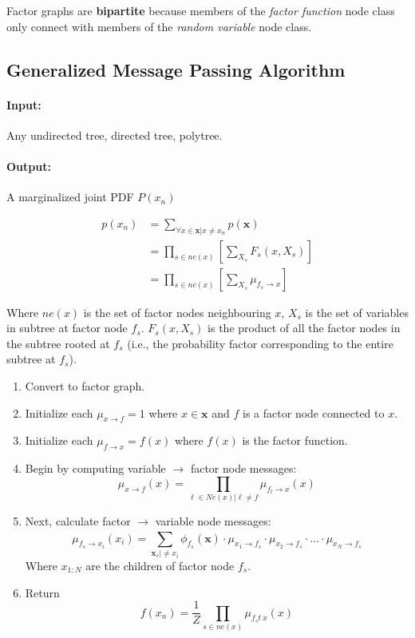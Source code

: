 \documentclass[a4paper,12pt]{report}
\begin{document}
Factor graphs are \textbf{bipartite} because members of the \textit{factor function} node class only connect with members of the \textit{random variable} node class.

\subsection{Generalized Message Passing Algorithm}

\paragraph{Input: } Any undirected tree, directed tree, polytree.

\paragraph{Output: } A marginalized joint PDF $P(x_n)$

\begin{equation}
\begin{split}
p(x_n) &= \sum_{\forall x\in \pmb x | x\neq x_n}^{} p(\pmb x) \\
&= \prod_{s\in ne(x)} [\sum_{X_s}^{} F_s(x, X_s)] \\
&= \prod_{s\in ne(x)} [\sum_{X_s} \mu_{f_s\to x}]
\end{split}
\end{equation}

Where $ne(x)$ is the set of factor nodes neighbouring $x$, $X_s$ is the set of variables in subtree at factor node $f_s$. $F_s(x, X_s)$ is the product of all the factor nodes in the subtree rooted at $f_s$ (i.e., the probability factor corresponding to the entire subtree at $f_s$). 


\begin{enumerate}
\item Convert to factor graph.
\item Initialize each $\mu_{x\to f} = 1$ where $x\in \pmb x$ and $f$ is a factor node connected to $x$.
\item Initialize each $\mu_{f\to x} = f(x)$ where $f(x)$ is the factor function.

\item Begin by computing variable $\to$ factor node messages:
\begin{equation}
\mu_{x\to f}(x) = \prod_{\ell \in Ne(x) | \ell \neq f} \mu_{f_l \to x}(x)
\end{equation}

\item Next, calculate factor $\to$ variable node messages:
\begin{equation}
\mu_{f_s\to x_i}(x_i) = \sum_{\pmb x_s | \neq x_i}^{} \phi_{f_s}(\pmb x) \cdot \mu_{x_1 \to f_s} \cdot \mu_{x_2 \to f_s} \cdot \dots \cdot \mu_{x_N \to f_s}
\end{equation}
Where $x_{1:N}$ are the children of factor node $f_s$.

\item Return \begin{equation}
f(x_n) = \frac{1}{Z} \prod_{s\in ne(x)} \mu_{f_s t\ x}(x)
\end{equation}
\end{enumerate}
\end{document}
